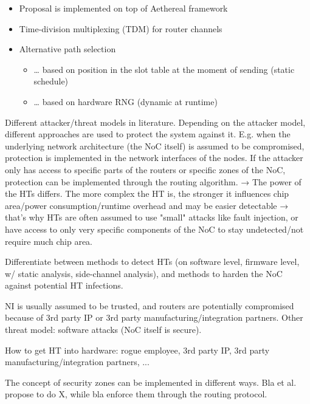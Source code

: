 \begin{itemize}
\begin{itemize}
            \item Proposal is implemented on top of Aethereal framework
            \item Time-division multiplexing (TDM) for router channels
            \item Alternative path selection
                \begin{itemize}
                    \item … based on position in the slot table at the moment of sending (static schedule)
                    \item … based on hardware RNG (dynamic at runtime)
                \end{itemize}
        \end{itemize}
\end{itemize}

Different attacker/threat models in literature. Depending on the attacker model, different approaches are used to protect the system against it.
E.g. when the underlying network architecture (the NoC itself) is assumed to be compromised, protection is implemented in the network interfaces
of the nodes. If the attacker only has access to specific parts of the routers or specific zones of the NoC, protection can be implemented through
the routing algorithm. → The power of the HTs differs. The more complex the HT is, the stronger it influences chip area/power consumption/runtime
overhead and may be easier detectable → that's why HTs are often assumed to use "small" attacks like fault injection, or have access to only very
specific components of the NoC to stay undetected/not require much chip area.

Differentiate between methods to detect HTs (on software level, firmware level, w/ static analysis, side-channel analysis), and methods to harden
the NoC against potential HT infections.

NI is usually assumed to be trusted, and routers are potentially compromised because of 3rd party IP or 3rd party manufacturing/integration
partners. Other threat model: software attacks (NoC itself is secure).

How to get HT into hardware: rogue employee, 3rd party IP, 3rd party manufacturing/integration partners, ...


The concept of security zones can be implemented in different ways. Bla et al. propose to do X, while bla enforce them through the routing protocol.
\fi
